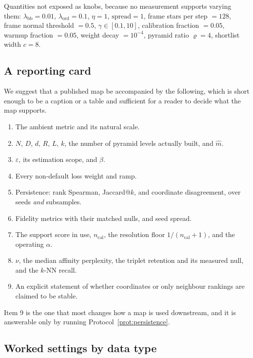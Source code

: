 \documentclass[12pt]{iopart}
\theoremstyle{definition}
\theoremstyle{plain}
\theoremstyle{remark}
\begin{document}
Quantities not exposed as knobs, because no measurement supports varying them:
$\lambda_{\mathrm{bb}}=0.01$, $\lambda_{\mathrm{ord}}=0.1$, $\eta=1$,
$\mathrm{spread}=1$, frame stars per step $=128$, frame normal threshold
$=0.5$, $\gamma\in[0.1,10]$, calibration fraction $=0.05$, warmup fraction
$=0.05$, weight decay $=10^{-4}$, pyramid ratio $\varrho=4$, shortlist width
$c=8$.

\subsection{A reporting card}
\label{sec:card}

We suggest that a published map be accompanied by the following, which is
short enough to be a caption or a table and sufficient for a reader to decide
what the map supports.

\begin{enumerate}[leftmargin=*,nosep]
\item The ambient metric and its natural scale.
\item $N$, $D$, $d$, $R$, $L$, $k$, the number of pyramid levels actually
  built, and $\hat m$.
\item $\varepsilon$, its estimation scope, and $\beta$.
\item Every non-default loss weight and ramp.
\item Persistence: rank Spearman, Jaccard@$k$, and coordinate disagreement,
  over seeds \emph{and} subsamples.
\item Fidelity metrics with their matched nulls, and seed spread.
\item The support score in use, $n_{\mathrm{cal}}$, the resolution floor
  $1/(n_{\mathrm{cal}}+1)$, and the operating $\alpha$.
\item $\nu$, the median affinity perplexity, the triplet retention and its
  measured null, and the $k$-NN recall.
\item An explicit statement of whether coordinates or only neighbour rankings
  are claimed to be stable.
\end{enumerate}

Item 9 is the one that most changes how a map is used downstream, and it is
answerable only by running Protocol~\ref{prot:persistence}.

\subsection{Worked settings by data type}
\label{sec:recipes}
\end{document}
